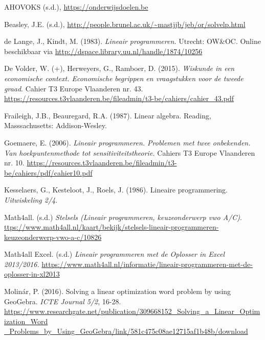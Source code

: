 \stopcontents[mainsections]			        %

\begin{bronnen}
	
	\item AHOVOKS (s.d.), \url {https://onderwijsdoelen.be}
	
	\item Beasley, J.E. (s.d.), \url{http://people.brunel.ac.uk/~mastjjb/jeb/or/solvelp.html}
	
	\item de Lange, J., Kindt, M. (1983). \textit{Lineair programmeren.} Utrecht: OW\&OC. Online beschikbaar via \url{http://dspace.library.uu.nl/handle/1874/10256}
	
	\item De Volder, W. (+), Herweyers, G., Ramboer, D. (2015). \emph{Wiskunde in een economische context. Economische begrippen en vraagstukken voor de tweede graad}. Cahier T3 Europe Vlaanderen nr. 43. \url{https://resources.t3vlaanderen.be/fileadmin/t3-be/cahiers/cahier_43.pdf}
	
	\item Fraileigh, J.B., Beauregard, R.A. (1987). Linear algebra. Reading, Masssachusetts: Addison-Wesley.
	
	\item Goemaere, E. (2006). \emph{Lineair programmeren. Problemen met twee onbekenden. Van hoekpuntenmethode tot sensitiviteitstheorie.} Cahiers T3 Europe Vlaanderen nr. 10. \url{ https://resources.t3vlaanderen.be/fileadmin/t3-be/cahiers/pdf/cahier10.pdf}
	
	\item Kesselaers, G., Kesteloot, J., Roels, J. (1986). Lineaire programmering. \emph{Uitwiskeling 2/4}.
	
	\item Math4all. (s.d.) \emph{Stelsels (Lineair programmeren, keuzeonderwerp vwo A/C)}. \url{ ttps://www.math4all.nl/kaart/bekijk/stelsels-lineair-programmeren-keuzeonderwerp-vwo-a-c/10826}
	
	\item Math4all Excel. (s.d.) \emph{Lineair programmeren met de Oplosser in Excel 2013/2016.} \url{https://www.math4all.nl/informatie/lineair-programmeren-met-de-oplosser-in-xl2013}	
	
	\item Molinár, P. (2016). Solving a linear optimization word problem by using GeoGebra. \emph{ICTE Journal 5/2}, 16-28. \url{https://www.researchgate.net/publication/309668152_Solving_a_Linear_Optimization_Word}\\ \url{_Problems_by_Using_GeoGebra/link/581c475c08ae12715af1b48b/download}
	

\end{bronnen}
